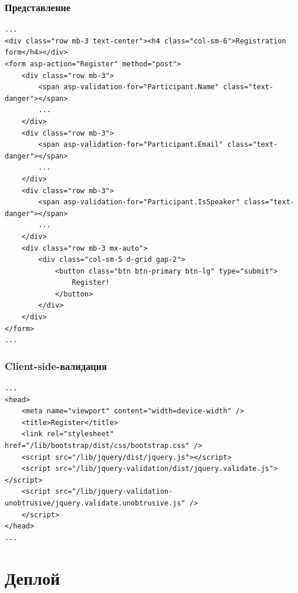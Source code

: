 \documentclass{../../slides-style}
\begin{document}
    \begin{frame}[fragile]
        \frametitle{Представление}
        \begin{ssmall}
            \begin{verbatim}
...
<div class="row mb-3 text-center"><h4 class="col-sm-6">Registration form</h4></div>
<form asp-action="Register" method="post">
    <div class="row mb-3">
        <span asp-validation-for="Participant.Name" class="text-danger"></span>
        ...
    </div>
    <div class="row mb-3">
        <span asp-validation-for="Participant.Email" class="text-danger"></span>
        ...
    </div>
    <div class="row mb-3">
        <span asp-validation-for="Participant.IsSpeaker" class="text-danger"></span>
        ...
    </div>
    <div class="row mb-3 mx-auto">
        <div class="col-sm-5 d-grid gap-2">
            <button class="btn btn-primary btn-lg" type="submit">
                Register!
            </button>
        </div>
    </div>
</form>
...
            \end{verbatim}
        \end{ssmall}
    \end{frame}

    \begin{frame}[fragile]
        \frametitle{Client-side-валидация}
        \begin{scriptsize}
            \begin{verbatim}
...
<head>
    <meta name="viewport" content="width=device-width" />
    <title>Register</title>
    <link rel="stylesheet" href="/lib/bootstrap/dist/css/bootstrap.css" />
    <script src="/lib/jquery/dist/jquery.js"></script>
    <script src="/lib/jquery-validation/dist/jquery.validate.js"></script>
    <script src="/lib/jquery-validation-unobtrusive/jquery.validate.unobtrusive.js" />
    </script>
</head>
...
            \end{verbatim}
        \end{scriptsize}
    \end{frame}

    \section{Деплой}
\end{document}
